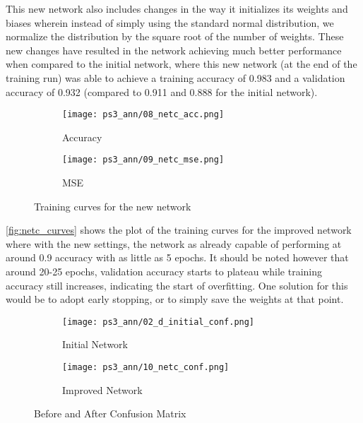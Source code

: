 \documentclass{article} %
\theoremstyle{definition}
\theoremstyle{remark}
\theoremstyle{plain}
\begin{document}
This new network also includes changes in the way it initializes its weights and biases wherein instead of simply using the standard normal distribution, we normalize the distribution by the square root of the number of weights. These new changes have resulted in the network achieving much better performance when compared to the initial network, where this new network (at the end of the training run) was able to achieve a training accuracy of 0.983 and a validation accuracy of 0.932 (compared to 0.911 and 0.888 for the initial network).

\begin{figure}[h!]
\centering
    \begin{subfigure}{.5\textwidth}
        \centering
        \texttt{[image: ps3\_ann/08\_netc\_acc.png]}
        \caption{Accuracy}
        \label{fig:reduced-svd}
    \end{subfigure}%
    \begin{subfigure}{.5\textwidth}
        \centering
        \texttt{[image: ps3\_ann/09\_netc\_mse.png]}
        \caption{MSE}
        \label{fig:reduced-svd}
    \end{subfigure}%
\caption{Training curves for the new network}
\label{fig:netc_curves}
\end{figure}

\autoref{fig:netc_curves} shows the plot of the training curves for the improved network where with the new settings, the network as already capable of performing at around 0.9 accuracy with as little as 5 epochs. It should be noted however that around 20-25 epochs, validation accuracy starts to plateau while training accuracy still increases, indicating the start of overfitting. One solution for this would be to adopt early stopping, or to simply save the weights at that point.

\begin{figure}[h!]
\centering
    \begin{subfigure}{.5\textwidth}
        \centering
        \texttt{[image: ps3\_ann/02\_d\_initial\_conf.png]}
        \caption{Initial Network}
    \end{subfigure}%
    \begin{subfigure}{.5\textwidth}
        \centering
        \texttt{[image: ps3\_ann/10\_netc\_conf.png]}
        \caption{Improved Network}
    \end{subfigure}%
\caption{Before and After Confusion Matrix}
\label{fig:netc_conf}
\end{figure}
\end{document}
